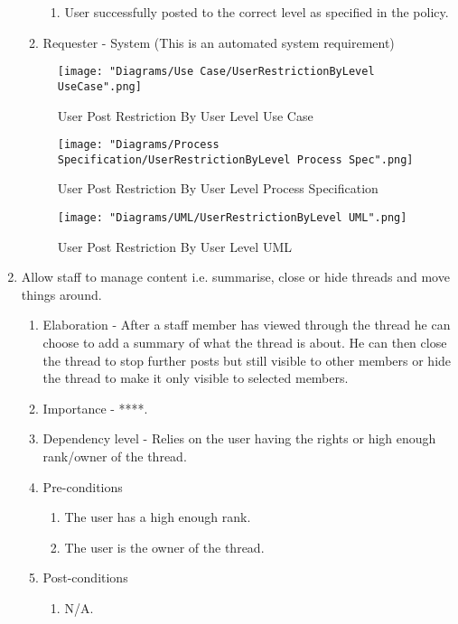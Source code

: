 \documentclass[12pt]{article}
\begin{document}
\begin{enumerate}
\begin{enumerate}
    \begin{enumerate}
    	\item User successfully posted to the correct level as specified in the policy.
    \end{enumerate}
    \item Requester - System (This is an automated system requirement)
  \end{enumerate}
\begin{figure}[h]
	\centering
	\texttt{[image: "Diagrams/Use Case/UserRestrictionByLevel UseCase".png]}
	\caption{User Post Restriction By User Level Use Case}
\end{figure}
\begin{figure}[h]
	\centering
	\texttt{[image: "Diagrams/Process Specification/UserRestrictionByLevel Process Spec".png]}
	\caption{User Post Restriction By User Level Process Specification}
\end{figure}
\begin{figure}[h]
	\centering
	\texttt{[image: "Diagrams/UML/UserRestrictionByLevel UML".png]}
	\caption{User Post Restriction By User Level UML}
\end{figure}
\clearpage %
   \item  Allow staff to manage content i.e. summarise, close or hide threads and move things around.%
  \begin{enumerate}
    \item Elaboration - After a staff member has viewed through the thread he can choose to add a summary of what the thread is about. He can then close the thread to stop further posts but still visible to other members or hide the thread to make it only visible to selected members.
    \item Importance - ****.
    \item Dependency level - Relies on the user having the rights or high enough rank/owner of the thread.
    \item Pre-conditions
    \begin{enumerate}
    	\item The user has a high enough rank.
    	\item The user is the owner of the thread.
    \end{enumerate}
        \item Post-conditions
    \begin{enumerate}
    	\item N/A.

\end{enumerate}
\end{enumerate}
\end{enumerate}
\end{document}
